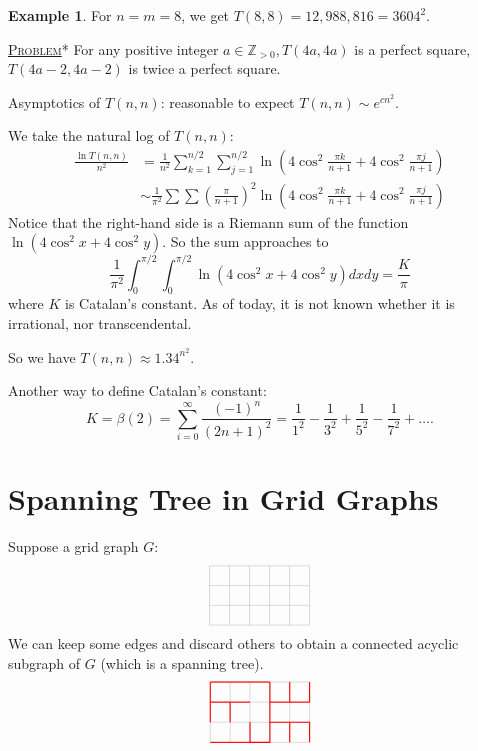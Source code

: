 \documentclass{report}
\newcommand{\Z}{\mathbb{Z}}
\newcommand{\fancyem}[1]{\underline{\textsc{#1}}}
\theoremstyle{definition}
\newtheorem{example}{Example}[section]
\theoremstyle{remark}
\numberwithin{equation}{section}
\begin{document}
\begin{example}
For $n = m = 8$, we get $T(8, 8) = 12,988,816 = 3604^2.$
\end{example}

\fancyem{Problem}* For any positive integer $a \in \Z_{>0}, T(4a, 4a)$ is a perfect square, $T(4a - 2, 4a - 2)$ is twice a perfect square.

Asymptotics of $T(n, n)$: reasonable to expect $T(n, n) \sim e^{cn^2}$.

We take the natural log of $T(n, n)$:
\begin{align*}
\frac{\ln T(n, n)}{n^2} & = \frac{1}{n^2}\sum_{k=1}^{n/2}\sum_{j=1}^{n/2} \ln\left(4\cos^2\frac{\pi k}{n+1} + 4\cos^2\frac{\pi j}{n+1}\right) \\
& \sim \frac{1}{\pi^2}\sum\sum \left(\frac{\pi}{n+1}\right)^2 \ln\left(4\cos^2\frac{\pi k}{n+1} + 4\cos^2\frac{\pi j}{n+1}\right)
\end{align*}
Notice that the right-hand side is a Riemann sum of the function $\ln(4\cos^2x+4\cos^2y)$. So the sum approaches to 
\[
\frac{1}{\pi^2} \int_0^{\pi/2}\int_0^{\pi/2} \ln(4\cos^2x+4\cos^2y)dxdy = \frac{K}{\pi}
\]
where $K$ is Catalan's constant. As of today, it is not known whether it is irrational, nor transcendental.

So we have $T(n, n) \approx 1.34^{n^2}.$

Another way to define Catalan's constant:
\[
K = \beta(2) = \sum_{i=0}^\infty \frac{(-1)^n}{(2n+1)^2} = \frac{1}{1^2} - \frac{1}{3^2} + \frac{1}{5^2} - \frac{1}{7^2} + \ldots.
\]

\section{Spanning Tree in Grid Graphs}
Suppose a grid graph $G$:
\[\begin{tikzpicture}
\draw[step=0.5cm,gray,very thin] (-1.5, 1) grid (1, -0.5);
\end{tikzpicture}\]
We can keep some edges and discard others to obtain a connected acyclic subgraph of $G$ (which is a spanning tree).
\[\begin{tikzpicture}
\draw[step=0.5cm,gray,very thin] (-1.5, 1) grid (1, -0.5);
\draw[red, thick] (-1.5, 1) -- (-1, 1);
\draw[red, thick] (-1.5, 1) -- (-1.5, 0.5);
\draw[red, thick] (-1, 1) -- (-0.5, 1);
\draw[red, thick] (-1.5, 0.5) -- (-1, 0.5);
\draw[red, thick] (-1.5, 0.5) -- (-1.5, 0);
\draw[red, thick] (-1, 0.5) -- (-1, 0);
\draw[red, thick] (-1, 0.5) -- (-0.5, 0.5);
\draw[red, thick] (-1.5, -0.5) -- (-1, -0.5);
\draw[red, thick] (-0.5, 1) -- (0, 1);
\draw[red, thick] (-1, -0.5) -- (-0.5, -0.5);
\draw[red, thick] (-0.5, -0.5) -- (-0.5, 0);
\draw[red, thick] (0, 1) -- (0, 0.5);
\draw[red, thick] (0, 0.5) -- (0.5, 0.5);
\draw[red, thick] (0, 0.5) -- (0, 0) -- (0, -0.5) -- (-0.5, -0.5);
\draw[red, thick] (0.5, 0.5) -- (0.5, 1);
\draw[red, thick] (0.5, 0.5) -- (1, 0.5);
\draw[red, thick] (1, 0.5) -- (1, 1);
\draw[red, thick] (0, 0) -- (0.5, 0) -- (0.5, -0.5);
\draw[red, thick] (0.5, 0) -- (1, 0) -- (1, -0.5);
\end{tikzpicture}\]
\end{document}
